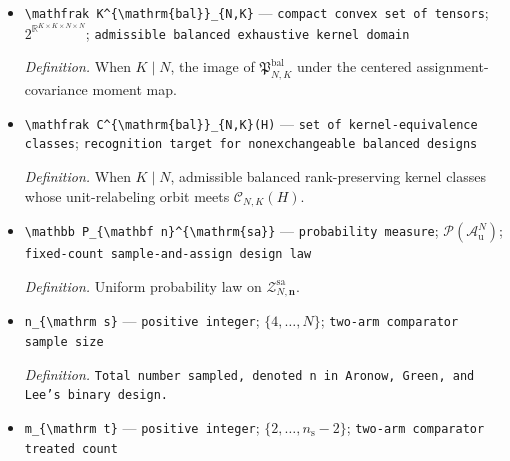 \documentclass{article}
\begin{document}
\begin{itemize}
  \par\smallskip\noindent\emph{Definition.} For \(K\mid N\), the balanced assignment-law polytope has \(n=N/K\) units per arm, no unassigned units, and unitwise arm marginals \(1/K\).
  \item \texttt{\textbackslash{}\allowbreak{}mathfrak K\textasciicircum{}\{\textbackslash{}\allowbreak{}mathrm\{bal\}\allowbreak{}\}\allowbreak{}\_\allowbreak{}\{N,\allowbreak{}K\}\allowbreak{}} --- \texttt{compact convex set of tensors}; \(2^{\mathbb R^{K\times K\times N\times N}}\); \texttt{admissible balanced exhaustive kernel domain}
  \par\smallskip\noindent\emph{Definition.} When \(K\mid N\), the image of \(\mathfrak P^{\mathrm{bal}}_{N,K}\) under the centered assignment-covariance moment map.
  \item \texttt{\textbackslash{}\allowbreak{}mathfrak C\textasciicircum{}\{\textbackslash{}\allowbreak{}mathrm\{bal\}\allowbreak{}\}\allowbreak{}\_\allowbreak{}\{N,\allowbreak{}K\}\allowbreak{}(H)} --- \texttt{set of kernel-\allowbreak{}equivalence classes}; \texttt{recognition target for nonexchangeable balanced designs}
  \par\smallskip\noindent\emph{Definition.} When \(K\mid N\), admissible balanced rank-preserving kernel classes whose unit-relabeling orbit meets \(\mathcal C_{N,K}(H)\).
  \item \texttt{\textbackslash{}\allowbreak{}mathbb P\_\allowbreak{}\{\textbackslash{}\allowbreak{}mathbf n\}\allowbreak{}\textasciicircum{}\{\textbackslash{}\allowbreak{}mathrm\{sa\}\allowbreak{}\}\allowbreak{}} --- \texttt{probability measure}; \(\mathcal P(\mathcal A_{\mathrm u}^N)\); \texttt{fixed-\allowbreak{}count sample-\allowbreak{}and-\allowbreak{}assign design law}
  \par\smallskip\noindent\emph{Definition.} Uniform probability law on \(\mathcal Z_{N,\mathbf n}^{\mathrm{sa}}\).
  \item \texttt{n\_\allowbreak{}\{\textbackslash{}\allowbreak{}mathrm s\}\allowbreak{}} --- \texttt{positive integer}; \(\{4,\ldots,N\}\); \texttt{two-\allowbreak{}arm comparator sample size}
  \par\smallskip\noindent\emph{Definition.} \texttt{Total number sampled,\allowbreak{} denoted n in Aronow,\allowbreak{} Green,\allowbreak{} and Lee's binary design.}
  \item \texttt{m\_\allowbreak{}\{\textbackslash{}\allowbreak{}mathrm t\}\allowbreak{}} --- \texttt{positive integer}; \(\{2,\ldots,n_{\mathrm s}-2\}\); \texttt{two-\allowbreak{}arm comparator treated count}

\end{itemize}
\end{document}
